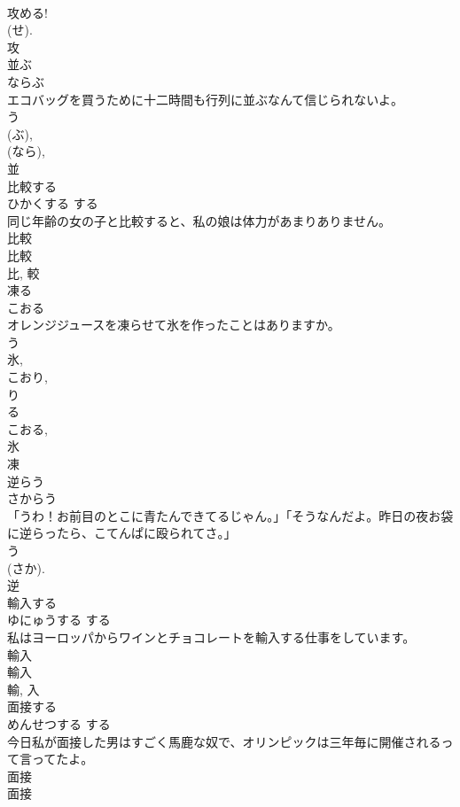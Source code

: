 \documentclass[8pt]{extreport}
\begin{document}
\begin{CJK}{UTF8}{min}
\\	攻める!
\\	(せ). 
\\	攻	
\\	並ぶ	
\\	ならぶ	
\\	エコバッグを買うために十二時間も行列に並ぶなんて信じられないよ。	
\\	う 
\\	(ぶ), 
\\	(なら), 
\\	並	
\\	比較する	
\\	ひかくする	する 
\\	同じ年齢の女の子と比較すると、私の娘は体力があまりありません。	
\\	比較 
\\	比較 
\\	比, 較	
\\	凍る	
\\	こおる	
\\	オレンジジュースを凍らせて氷を作ったことはありますか。	
\\	う 
\\	氷, 
\\	こおり, 
\\	り 
\\	る 
\\	こおる, 
\\	氷
\\	凍	
\\	逆らう	
\\	さからう	
\\	「うわ！お前目のとこに青たんできてるじゃん。」「そうなんだよ。昨日の夜お袋に逆らったら、こてんぱに殴られてさ。」	
\\	う 
\\	(さか). 
\\	逆	
\\	輸入する	
\\	ゆにゅうする	する 
\\	私はヨーロッパからワインとチョコレートを輸入する仕事をしています。	
\\	輸入 
\\	輸入 
\\	輸, 入	
\\	面接する	
\\	めんせつする	する 
\\	今日私が面接した男はすごく馬鹿な奴で、オリンピックは三年毎に開催されるって言ってたよ。	
\\	面接 
\\	面接 

\end{CJK}
\end{document}
